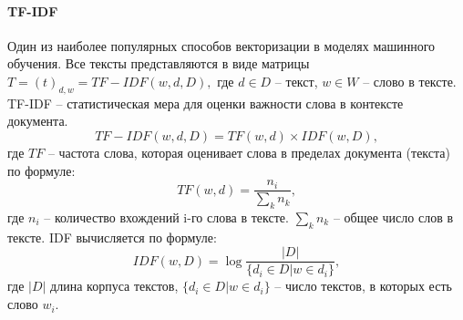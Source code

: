 \paragraph{TF-IDF}
\par
Один из наиболее популярных способов векторизации в моделях машинного обучения. Все тексты представляются в виде матрицы $T = \left(t\right)_{d,w} = TF-IDF(w,d,D),$ где $d \in D$ -- текст, $w \in W$ -- слово в тексте. TF-IDF -- статистическая мера для оценки важности слова в контексте документа.
\[TF-IDF(w,d,D) = TF(w,d) \times IDF(w, D),\]
где $TF$ -- частота слова, которая оценивает слова в пределах документа (текста) по формуле:
\[TF(w,d) = \dfrac{n_i}{\sum\limits_{k}n_k},\]
где $n_i$ -- количество вхождений i-го слова в тексте. $\sum\limits_{k}n_k$ -- общее число слов в тексте. IDF вычисляется по формуле:
\[IDF(w,D) = \log \dfrac{|D|}{\{d_i \in D | w \in d_i\}},\]
где $|D|$ длина корпуса текстов, $\{d_i \in D | w \in d_i\}$ -- число текстов, в которых есть слово $w_i.$ 
